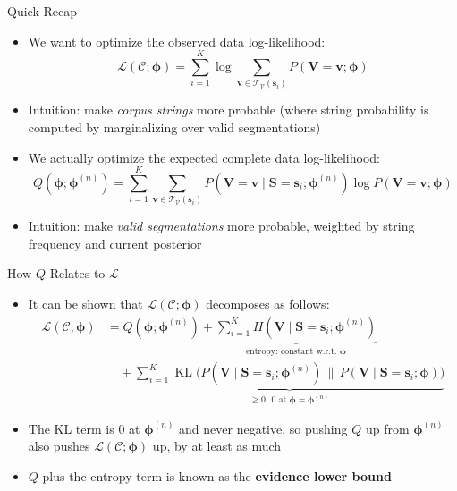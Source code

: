 \documentclass[11pt,compress,t,notes=noshow, xcolor=table]{beamer}
\newcommand{\vocab}{\mathcal{V}}
\newcommand{\probs}{\boldsymbol{\phi}}
\begin{document}
\begin{frame}{Quick Recap}

\vfill 

\begin{itemize}
\item We want to optimize the observed data log-likelihood:
\begin{equation*}
\mathcal{L}(\mathcal{C}; \probs)= \sum_{i=1}^{K} \log \sum_{\mathbf{v} \in \mathcal{T}_{\vocab}(\mathbf{s}_i)} P(\mathbf{V} = \mathbf{v}; \probs)
\end{equation*}
\item Intuition: make \emph{corpus strings} more probable (where string probability is computed by marginalizing over valid segmentations)
\item We actually optimize the expected complete data log-likelihood:
\begin{equation*}
Q(\probs; \probs^{(n)}) = \sum_{i=1}^{K} \sum_{\mathbf{v} \in \mathcal{T}_{\vocab}(\mathbf{s}_i)} P(\mathbf{V} = \mathbf{v} \mid \mathbf{S} = \mathbf{s}_i; \probs^{(n)}) \log P(\mathbf{V} = \mathbf{v}; \probs)
\end{equation*}
\item Intuition: make \emph{valid segmentations} more probable, weighted by string frequency and current posterior
\end{itemize}

\vfill 

\end{frame}


\begin{frame}{How $Q$ Relates to $\mathcal{L}$}
 
\vfill
 
\begin{itemize}
\item It can be shown that $\mathcal{L}(\mathcal{C}; \probs)$ decomposes as follows:
\begin{align*}
\mathcal{L}(\mathcal{C}; \probs) &= Q(\probs; \probs^{(n)}) + \underbrace{\sum_{i=1}^{K} H(\mathbf{V} \mid \mathbf{S} = \mathbf{s}_i; \probs^{(n)})}_{\text{entropy: constant w.r.t.\ } \probs}\\
&\quad + \underbrace{\sum_{i=1}^{K} \operatorname{KL}\big(P(\mathbf{V} \mid \mathbf{S} = \mathbf{s}_i; \probs^{(n)}) \,\big\|\, P(\mathbf{V} \mid \mathbf{S} = \mathbf{s}_i; \probs)\big)}_{\geq 0;\ 0 \text{ at } \probs = \probs^{(n)}}
\end{align*}
\item The KL term is $0$ at $\probs^{(n)}$ and never negative, so pushing $Q$ up from $\probs^{(n)}$ also pushes $\mathcal{L}(\mathcal{C}; \probs)$ up, by at least as much
\item $Q$ plus the entropy term is known as the \textbf{evidence lower bound}
\end{itemize}
 
\vfill
 
\end{frame}
 
\end{document}
